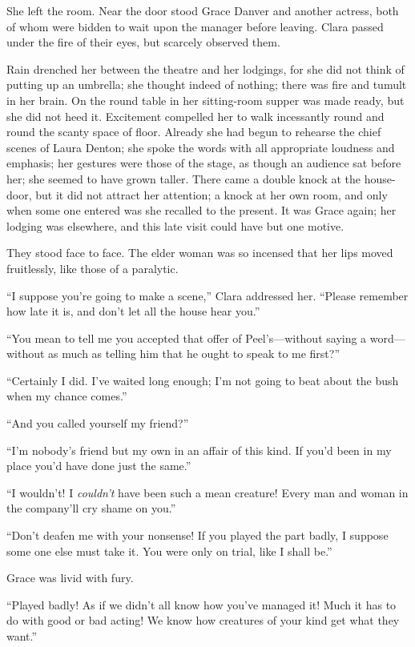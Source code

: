 She left the room. Near the door stood Grace Danver and another actress,
both of whom were bidden to wait upon the manager before leaving. Clara
passed under the fire of their eyes, but scarcely observed them.

Rain drenched her between the theatre and her lodgings, for she did not
think of putting up an umbrella; she thought indeed of
{\protect\hypertarget{209}{}{}}nothing; there was fire and tumult in her
brain. On the round table in her sitting-room supper was made ready, but
she did not heed it. Excitement compelled her to walk incessantly round
and round the scanty space of floor. Already she had begun to rehearse
the chief scenes of Laura Denton; she spoke the words with all
appropriate loudness and emphasis; her gestures were those of the stage,
as though an audience sat before her; she seemed to have grown taller.
There came a double knock at the house-door, but it did not attract her
attention; a knock at her own room, and only when some one entered was
she recalled to the present. It was Grace again; her lodging was
elsewhere, and this late visit could have but one motive.

They stood face to face. The elder woman was so incensed that her lips
moved fruitlessly, like those of a paralytic.

``I suppose you're going to make a scene,'' Clara addressed her.
``Please remember how late it is, and don't let all the house hear
you.''

``You mean to tell me you accepted that
{\protect\hypertarget{210}{}{}}offer of Peel's---without saying a
word---without as much as telling him that he ought to speak to me
first?''

``Certainly I did. I've waited long enough; I'm not going to beat about
the bush when my chance comes.''

``And you called yourself my friend?''

``I'm nobody's friend but my own in an affair of this kind. If you'd
been in my place you'd have done just the same.''

``I wouldn't! I \emph{couldn't} have been such a mean creature! Every
man and woman in the company'll cry shame on you.''

``Don't deafen me with your nonsense! If you played the part badly, I
suppose some one else must take it. You were only on trial, like I shall
be.''

Grace was livid with fury.

``Played badly! As if we didn't all know how you've managed it! Much it
has to do with good or bad acting! We know how creatures of your kind
get what they want.''

